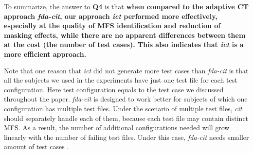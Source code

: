 \documentclass[10pt,journal,compsoc]{IEEEtran}
\begin{document}
To summarize, the answer to \textbf{Q4} is that
\textbf{when compared to the adaptive CT approach \emph{fda-cit}, our approach \emph{ict} performed more effectively, especially at the quality of MFS identification and reduction of masking effects, while there are no apparent differences between them at the cost (the number of test cases). This also indicates that \emph{ict} is a more efficient approach.}


Note that one reason that \emph{ict} did not generate more test cases than \emph{fda-cit} is that all the subjects we used in the experiments have just one test file for each test configuration. Here test configuration equals to the test case we discussed throughout the paper.    \emph{fda-cit} is designed to work better for subjects of which one configuration has multiple test files. Under the scenario of multiple test files, \emph{cit} should separately handle each of them, because each test file may contain distinct MFS. As a result, the number of additional configurations needed will grow linearly with the number of failing test files. Under this case, \emph{fda-cit} needs smaller amount of test cases \cite{yilmaz2013reducing}.


%
%
%
%
%
\end{document}
